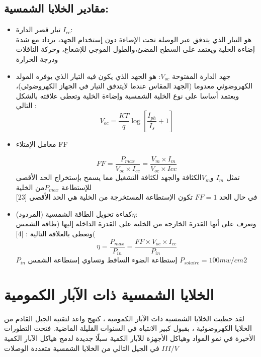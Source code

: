 	\subsection{  مقادير الخلايا الشمسية:  } 
	\begin{itemize}
		\item تيار قصر الدارة $ I_{cc} $:
		\\
		هو التيار الذي يتدفق عبر الوصلة تحت الإضاءة دون إستخدام الجهد، يزداد مع شدة إضاءة الخلية ويعتمد على السطح المضئ،والطول الموجي للإشعاع، وحركة الناقلات ودرجة الحرارة
		\item جهد الدارة المفتوحة  $ V_{oc} $:
		هو الجهد الذي يكون فيه التيار الذي يوفره المولد الكهروضوئي معدوما (الجهد المقاس عندما لايتدفق التيار في الجهاز الكهروضوئي)، ويعتمد أساسا على نوع الخلية الشمسية وإضاءة الخلية وتعطى علاقته بالشكل التالي :
		\begin {equation} 
		V_{oc}=\frac{KT}{q}\log [\frac{I_{ph}}{I_s} +1]
		\end {equation}
		\item معامل الإمتلاء FF
		
		\begin {equation} 
		FF=\frac{P_{max}}{V_ {oc} ×I_ {cc }}
		=\frac{ V_m×I_m}{ V_{oc} ×I{cc}}
		\end {equation}
		تمثل  $  I_m $ و$ V_m  $الكثافة والجهد لكثافة التشغيل مما يسمح بإستخراج الحد الأقصى للإستطاعة  $ P_{max}  $من الخلية \\
		في حال الحد $  FF=1 $ تكون الإستطاعة المستخرجة من الخلية هي الحد الأقصى 
		[23]
		\item  كفاءة تحويل الطاقة الشمسية (المردود)$\eta$:      \\
		وتعرف على أنها القدرة الخارجة من الخلية على القدرة الداخلة إليها (طاقة الشمس )وتعطى بالعلاقة التالية :
		[4]
		\begin {equation} 
		\eta= \frac{ P_{max}}{P_{in}}
		=\frac{ FF×V_{oc}× I_{cc}}{ P_{in}}
		\end {equation}
		$ P_{in} $				           
		إستطاعة الضوء الساقط وتساوي إستطاعة الشمس $ P_{solaire}=100 mw/cm2 $		  
	\end{itemize}
	
	\section { الخلايا الشمسية ذات الآبار الكمومية  }
	لقد حظيت الخلايا الشمسية ذات الآبار الكمومية ، كنهج واعد لتقنية الجيل القادم من الخلايا الكهروضوئية ، بقبول كبير الانتباه في السنوات القليلة الماضية. فتحت التطورات الأخيرة في نمو المواد وهياكل الأجهزة للآبار الكمية سبلًا جديدة لدمج هياكل الآبار الكمية في الجيل التالي من الخلايا الشمسية متعددة الوصلات $ III / V $
